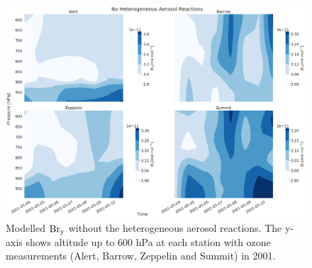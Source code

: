 \begin{figure}
    \centering
    \includegraphics[width = \linewidth]{Chapter6_Results/images/noAerosol_2001_bry.png}
    \caption{Modelled $\mathrm{Br_y}$ without the heterogeneous aerosol reactions. The y-axis shows altitude up to 600 hPa at each station with ozone measurements (Alert, Barrow, Zeppelin and Summit) in 2001.}
    \label{fig:vert_noAer_bry_2001}
\end{figure}